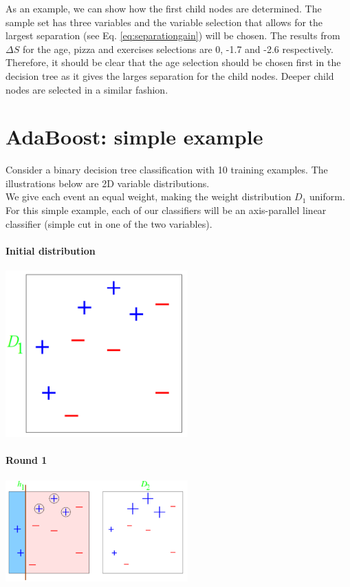 \begin{appendices}
\noindent As an example, we can show how the first child nodes are determined. The sample set has three variables and the variable selection that allows for the largest separation (see Eq. \ref{eq:separationgain}) will be chosen. The results from $\Delta S$ for the age, pizza and exercises selections are 0, -1.7 and -2.6 respectively. Therefore, it should be clear that the age selection should be chosen first in the decision tree as it gives the larges separation for the child nodes. Deeper child nodes are selected in a similar fashion. 

\section{AdaBoost: simple example}
Consider a binary decision tree classification with 10 training examples. The illustrations below are 2D variable distributions.\\
\newline
\noindent We give each event an equal weight, making the weight distribution $D_1$ uniform. For this simple example, each of our classifiers will be an axis-parallel linear classifier (simple cut in one of the two variables).

\paragraph{Initial distribution}


\begin{center}
\includegraphics[width=7cm]{appendix/img/adaboost1.png}
\end{center}

\paragraph{Round 1}
\begin{center}
\includegraphics[width=7cm]{appendix/img/adaboost2.png}
\end{center}


\end{appendices}
